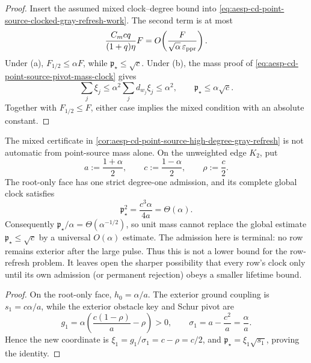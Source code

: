 \begin{proof}
Insert the assumed mixed clock--degree bound into
\cref{eq:aesp-cd-point-source-clocked-gray-refresh-work}.  The second term is
at most
\begin{equation*}
 \frac{C_mcq}{(1+q)\eta}F
 =O\!\left(\frac{F}{\sqrt\alpha\,\varepsilon_{\rm ppr}}\right).
\end{equation*}
Under (a), \(F_{1/2}\leq\alpha F\), while
\(\mathfrak p_\star\leq\sqrt c\).  Under (b), the mass proof of
\cref{eq:aesp-cd-point-source-pivot-mass-clock} gives
\begin{equation*}
 \sum_j\xi_j
 \leq\alpha^2\sum_jd_{w_j}\xi_j
 \leq\alpha^2,
 \qquad
 \mathfrak p_\star\leq\alpha\sqrt c.
\end{equation*}
Together with \(F_{1/2}\leq F\), either case implies the mixed condition
with an absolute constant.
\end{proof}

\begin{proposition}
\label{prop:aesp-cd-point-source-low-degree-clock-stop}
The mixed certificate in
\cref{cor:aesp-cd-point-source-high-degree-gray-refresh} is not automatic
from point-source mass alone.  On the unweighted edge \(K_2\), put
\begin{equation*}
 a:=\frac{1+\alpha}{2},
 \qquad
 c:=\frac{1-\alpha}{2},
 \qquad
 \rho:=\frac c2.
\end{equation*}
The root-only face has one strict degree-one admission, and its complete
global clock satisfies
\begin{equation}
 \mathfrak p_\star^2
 =\frac{c^3\alpha}{4a}
 =\Theta(\alpha).
 \label{eq:aesp-cd-point-source-low-degree-clock-stop}
\end{equation}
Consequently \(\mathfrak p_\star/\alpha=\Theta(\alpha^{-1/2})\), so unit
mass cannot replace the global estimate \(\mathfrak p_\star\leq\sqrt c\) by
a universal \(O(\alpha)\) estimate.  The admission here is terminal: no row
remains exterior after the large pulse.  Thus this is not a lower bound for
the row-refresh problem.  It leaves open the sharper possibility that every
row's clock only until its own admission (or permanent rejection) obeys a
smaller lifetime bound.
\end{proposition}

\begin{proof}
On the root-only face, \(h_0=\alpha/a\).  The exterior ground coupling is
\(s_1=c\alpha/a\), while the exterior obstacle key and Schur pivot are
\begin{equation*}
 g_1=\alpha\left(\frac{c(1-\rho)}a-\rho\right)>0,
 \qquad
 \sigma_1=a-\frac{c^2}a=\frac\alpha a.
\end{equation*}
Hence the new coordinate is
\(\xi_1=g_1/\sigma_1=c-\rho=c/2\), and
\(\mathfrak p_\star=\xi_1\sqrt{s_1}\), proving the identity.
\end{proof}

